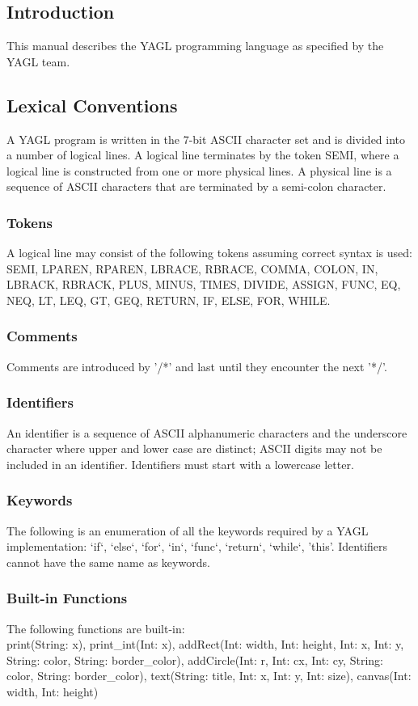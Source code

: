 \documentclass[12pt]{article}
\begin{document}
\subsection{Introduction}
This manual describes the YAGL programming language as specified by the YAGL team. 

\subsection{Lexical Conventions}
A YAGL program is written in the 7-bit ASCII character set and is divided into a number of logical lines. A logical line terminates by the token SEMI, where a logical line is constructed from one or more physical lines. A physical line is a sequence of ASCII characters that are terminated by a semi-colon character.

\subsubsection{Tokens}
A logical line may consist of the following tokens assuming correct syntax is used: \\
SEMI, LPAREN, RPAREN, LBRACE, RBRACE, COMMA, COLON, IN, LBRACK, RBRACK, PLUS, MINUS, TIMES, DIVIDE, ASSIGN, FUNC, EQ, NEQ, LT, LEQ, GT, GEQ, RETURN, IF, ELSE, FOR, WHILE. 

\subsubsection{Comments} 
Comments are introduced by '/*' and last until they encounter the next '*/'.

\subsubsection{Identifiers}
An identifier is a sequence of ASCII alphanumeric characters and the underscore character where upper and lower case are distinct; ASCII digits may not be included in an identifier.  Identifiers must start with a lowercase letter.

\subsubsection{Keywords}
The following is an enumeration of all the keywords required by a YAGL implementation:
`if`, `else`, `for`, `in`, `func`, `return`, `while`, 'this'.  Identifiers cannot have the same name as keywords.

\subsubsection{Built-in Functions}
The following functions are built-in:\\
print(String: x), print\_int(Int: x), addRect(Int: width, Int: height, Int: x, Int: y, String: color, String: border\_color), addCircle(Int: r, Int: cx, Int: cy, String: color, String: border\_color), text(String: title, Int: x, Int: y, Int: size), canvas(Int: width, Int: height)
\end{document}
